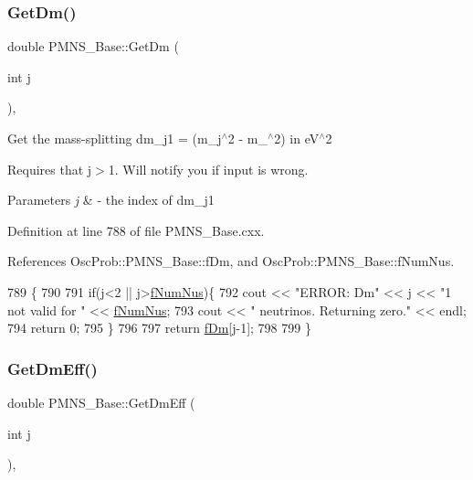 \subsubsection{\texorpdfstring{Get\+Dm()}{GetDm()}}
{\footnotesize\ttfamily double P\+M\+N\+S\+\_\+\+Base\+::\+Get\+Dm (\begin{DoxyParamCaption}\item[{int}]{j }\end{DoxyParamCaption})\hspace{0.3cm}{\ttfamily [virtual]}, {\ttfamily [inherited]}}

Get the mass-\/splitting dm\+\_\+j1 = (m\+\_\+j$^\wedge$2 -\/ m\+\_$^\wedge$2) in e\+V$^\wedge$2

Requires that j$>$1. Will notify you if input is wrong.


\begin{DoxyParams}{Parameters}
{\em j} & -\/ the index of dm\+\_\+j1 \\
\hline
\end{DoxyParams}


Definition at line 788 of file P\+M\+N\+S\+\_\+\+Base.\+cxx.



References Osc\+Prob\+::\+P\+M\+N\+S\+\_\+\+Base\+::f\+Dm, and Osc\+Prob\+::\+P\+M\+N\+S\+\_\+\+Base\+::f\+Num\+Nus.


\begin{DoxyCode}
789 \{
790 
791   \textcolor{keywordflow}{if}(j<2 || j>\hyperlink{classOscProb_1_1PMNS__Base_a24bb74bed63569dfe88b18fa6a08060e}{fNumNus})\{
792     cout << \textcolor{stringliteral}{"ERROR: Dm"} << j << \textcolor{stringliteral}{"1 not valid for "} << \hyperlink{classOscProb_1_1PMNS__Base_a24bb74bed63569dfe88b18fa6a08060e}{fNumNus};
793     cout << \textcolor{stringliteral}{" neutrinos. Returning zero."} << endl;
794     \textcolor{keywordflow}{return} 0;
795   \}
796 
797   \textcolor{keywordflow}{return} \hyperlink{classOscProb_1_1PMNS__Base_a406a31c3b5d620e5a0cace5b411f9f70}{fDm}[j-1];
798 
799 \}
\end{DoxyCode}
\mbox{\label{classOscProb_1_1PMNS__Base_a4ea861a6707ce1be3a54aad2b60f8632}} 
\subsubsection{\texorpdfstring{Get\+Dm\+Eff()}{GetDmEff()}}
{\footnotesize\ttfamily double P\+M\+N\+S\+\_\+\+Base\+::\+Get\+Dm\+Eff (\begin{DoxyParamCaption}\item[{int}]{j }\end{DoxyParamCaption})\hspace{0.3cm}{\ttfamily [virtual]}, {\ttfamily [inherited]}}

